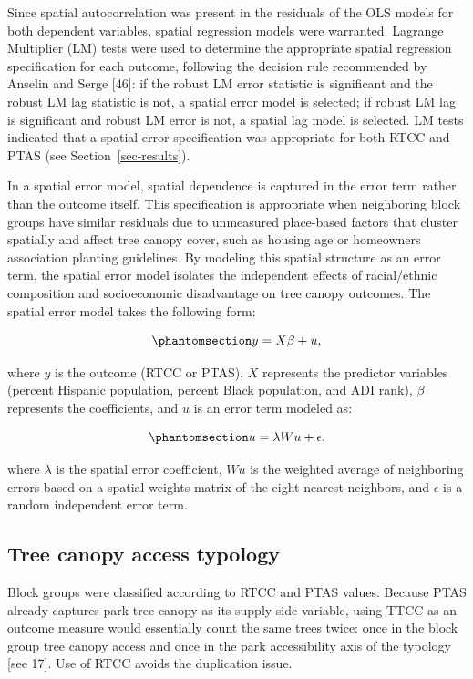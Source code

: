 \documentclass[
  sn-basic,
]{sn-jnl}
\begin{document}
Since spatial autocorrelation was present in the residuals of the OLS
models for both dependent variables, spatial regression models were
warranted. Lagrange Multiplier (LM) tests were used to determine the
appropriate spatial regression specification for each outcome, following
the decision rule recommended by Anselin and Serge {[}46{]}: if the
robust LM error statistic is significant and the robust LM lag statistic
is not, a spatial error model is selected; if robust LM lag is
significant and robust LM error is not, a spatial lag model is selected.
LM tests indicated that a spatial error specification was appropriate
for both RTCC and PTAS (see Section~\ref{sec-results}).

In a spatial error model, spatial dependence is captured in the error
term rather than the outcome itself. This specification is appropriate
when neighboring block groups have similar residuals due to unmeasured
place-based factors that cluster spatially and affect tree canopy cover,
such as housing age or homeowners association planting guidelines. By
modeling this spatial structure as an error term, the spatial error
model isolates the independent effects of racial/ethnic composition and
socioeconomic disadvantage on tree canopy outcomes. The spatial error
model takes the following form:

\begin{equation}\protect\phantomsection\label{eq-sem}{y = X \beta + u,}\end{equation}

where \(y\) is the outcome (RTCC or PTAS), \(X\) represents the
predictor variables (percent Hispanic population, percent Black
population, and ADI rank), \(\beta\) represents the coefficients, and
\(u\) is an error term modeled as:

\begin{equation}\protect\phantomsection\label{eq-error}{u = \lambda Wu + \epsilon,}\end{equation}

where \(\lambda\) is the spatial error coefficient, \(Wu\) is the
weighted average of neighboring errors based on a spatial weights matrix
of the eight nearest neighbors, and \(\epsilon\) is a random independent
error term.

\subsection{Tree canopy access typology}\label{sec-methods-multinom}

Block groups were classified according to RTCC and PTAS values. Because
PTAS already captures park tree canopy as its supply-side variable,
using TTCC as an outcome measure would essentially count the same trees
twice: once in the block group tree canopy access and once in the park
accessibility axis of the typology {[}see 17{]}. Use of RTCC avoids the
duplication issue.
\end{document}
